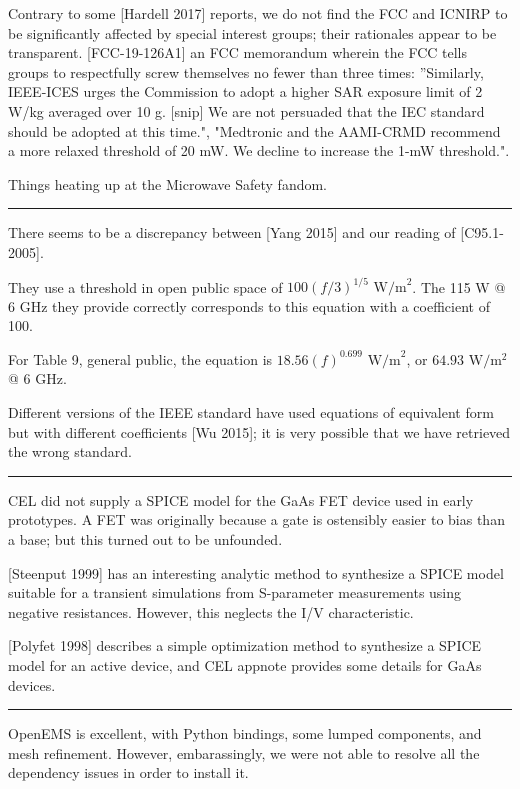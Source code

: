 \documentclass[paper.tex]{subfiles}
\begin{document}
Contrary to some [Hardell 2017] reports, we do not find the FCC and ICNIRP to be significantly affected by special interest groups; their rationales appear to be transparent.  [FCC-19-126A1] an FCC memorandum wherein the FCC tells groups to respectfully screw themselves no fewer than three times: ''Similarly, IEEE-ICES urges the Commission to
adopt a higher SAR exposure limit of 2 W/kg averaged over 10 g. [snip] We are not persuaded that the IEC standard should be adopted at this time.", "Medtronic and the AAMI-CRMD recommend a more relaxed threshold of 20 mW. We decline to increase the 1-mW threshold.". 

Things heating up at the Microwave Safety fandom.


\clearpage
\rule{\linewidth}{0.2pt}

There seems to be a discrepancy between [Yang 2015] and our reading of [C95.1-2005].

They use a threshold in open public space of $100(f/3)^{1/5} \text{ W/m}^2$. The 115 W @ 6 GHz they provide correctly corresponds to this equation with a coefficient of 100.

For Table 9, general public, the equation is $18.56 (f)^{0.699} \text{ W/m}^2$, or $64.93 \text{ W}/\text{m}^2$ @ 6 GHz. 

Different versions of the IEEE standard have used equations of equivalent form but with different coefficients [Wu 2015]; it is very possible that we have retrieved the wrong standard.

\rule{\linewidth}{0.2pt}

CEL did not supply a SPICE model for the GaAs FET device used in early prototypes. A FET was originally because a gate is ostensibly easier to bias than a base; but this turned out to be unfounded.

[Steenput 1999] has an interesting analytic method to synthesize a SPICE model suitable for a transient simulations from S-parameter measurements using negative resistances. However, this neglects the I/V characteristic. 

[Polyfet 1998] describes a simple optimization method to synthesize a SPICE model for an active device, and CEL appnote provides some details for GaAs devices.



\rule{\linewidth}{0.2pt}

OpenEMS is excellent, with Python bindings, some lumped components, and mesh refinement. However, embarassingly, we were not able to resolve all the dependency issues in order to install it.
\end{document}
